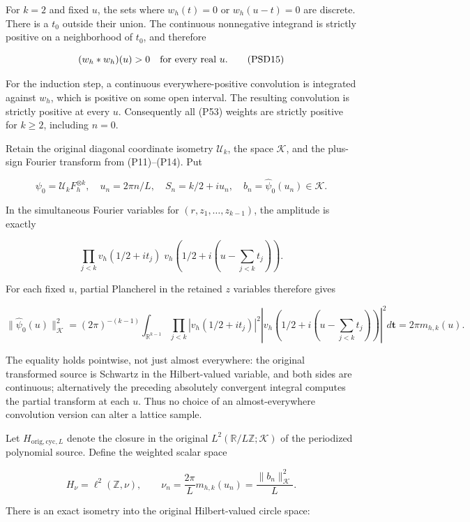 \documentclass{article}
\begin{document}
For \(k=2\) and fixed \(u\), the sets where \(w_h(t)=0\) or \(w_h(u-t)=0\) are discrete. There is a \(t_0\) outside their union. The continuous nonnegative integrand is strictly positive on a neighborhood of \(t_0\), and therefore

\[
(w_h*w_h)(u)>0\quad\hbox{for every real }u.
\tag{PSD15}
\]

For the induction step, a continuous everywhere-positive convolution is integrated against \(w_h\), which is positive on some open interval. The resulting convolution is strictly positive at every \(u\). Consequently all (P53) weights are strictly positive for \(k\ge 2\), including \(n=0\).

Retain the original diagonal coordinate isometry \(\mathcal U_k\), the space \(\mathcal K\), and the plus-sign Fourier transform from (P11)--(P14). Put

\[
\psi_0=\mathcal U_kF_h^{\otimes k},\quad
u_n=2\pi n/L,\quad S_n=k/2+iu_n,\quad
b_n=\widehat\psi_0(u_n)\in\mathcal K.
\]

In the simultaneous Fourier variables for \((r,z_1,\ldots,z_{k-1})\), the amplitude is exactly

\[
\prod_{j<k}v_h(1/2+it_j)\;
v_h\left(1/2+i\left(u-\sum_{j<k}t_j\right)\right).
\]

For each fixed \(u\), partial Plancherel in the retained \(z\) variables therefore gives

\[
\|\widehat\psi_0(u)\|_{\mathcal K}^2
=(2\pi)^{-(k-1)}\int_{\mathbb R^{k-1}}
\prod_{j<k}|v_h(1/2+it_j)|^2
\left|v_h\left(1/2+i\left(u-\sum_{j<k}t_j\right)\right)\right|^2d\mathbf t
=2\pi m_{h,k}(u).
\tag{PSD16}
\]

The equality holds pointwise, not just almost everywhere: the original transformed source is Schwartz in the Hilbert-valued variable, and both sides are continuous; alternatively the preceding absolutely convergent integral computes the partial transform at each \(u\). Thus no choice of an almost-everywhere convolution version can alter a lattice sample.

Let \(H_{\mathrm{orig,cyc},L}\) denote the closure in the original \(L^2(\mathbb R/L\mathbb Z;\mathcal K)\) of the periodized polynomial source. Define the weighted scalar space

\[
H_\nu=\ell^2(\mathbb Z,\nu),\qquad
\nu_n=\frac{2\pi}{L}m_{h,k}(u_n)=\frac{\|b_n\|_{\mathcal K}^2}{L}.
\tag{PSD17}
\]

There is an exact isometry into the original Hilbert-valued circle space:
\end{document}
